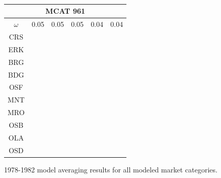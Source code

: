 \documentclass[12pt]{article}
\begin{document}
\begin{landscape}
\begin{figure}
{\begin{minipage}[c]{0.3\textwidth}
\begin{tabular}{|c|c|c|c|c|c|}
\end{tabular}\\$~$\\$~$\\
\begin{tabular}{|c|c|c|c|c|c|}
         \hline \multicolumn{6}{|c|}{MCAT 961} \\ \hline
         $\omega$&0.05&0.05&0.05&0.04&0.04 \\ \hline
        CRS&\cellcolor[HTML]{E41A1C}&\cellcolor[HTML]{E41A1C}&\cellcolor[HTML]{E41A1C}&\cellcolor[HTML]{E41A1C}&\cellcolor[HTML]{E41A1C} \\ \hline
        ERK&\cellcolor[HTML]{E41A1C}&\cellcolor[HTML]{E41A1C}&\cellcolor[HTML]{E41A1C}&\cellcolor[HTML]{377EB8}&\cellcolor[HTML]{377EB8} \\ \hline
        BRG&\cellcolor[HTML]{377EB8}&\cellcolor[HTML]{377EB8}&\cellcolor[HTML]{377EB8}&\cellcolor[HTML]{4DAF4A}&\cellcolor[HTML]{4DAF4A} \\ \hline
        BDG&\cellcolor[HTML]{377EB8}&\cellcolor[HTML]{377EB8}&\cellcolor[HTML]{377EB8}&\cellcolor[HTML]{4DAF4A}&\cellcolor[HTML]{4DAF4A} \\ \hline
        OSF&\cellcolor[HTML]{377EB8}&\cellcolor[HTML]{377EB8}&\cellcolor[HTML]{377EB8}&\cellcolor[HTML]{4DAF4A}&\cellcolor[HTML]{4DAF4A} \\ \hline
        MNT&\cellcolor[HTML]{4DAF4A}&\cellcolor[HTML]{4DAF4A}&\cellcolor[HTML]{4DAF4A}&\cellcolor[HTML]{984EA3}&\cellcolor[HTML]{984EA3} \\ \hline
        MRO&\cellcolor[HTML]{984EA3}&\cellcolor[HTML]{4DAF4A}&\cellcolor[HTML]{4DAF4A}&\cellcolor[HTML]{FF7F00}&\cellcolor[HTML]{984EA3} \\ \hline
        OSB&\cellcolor[HTML]{984EA3}&\cellcolor[HTML]{984EA3}&\cellcolor[HTML]{984EA3}&\cellcolor[HTML]{FFFF33}&\cellcolor[HTML]{984EA3} \\ \hline
        OLA&\cellcolor[HTML]{FF7F00}&\cellcolor[HTML]{984EA3}&\cellcolor[HTML]{FF7F00}&\cellcolor[HTML]{FFFF33}&\cellcolor[HTML]{FF7F00} \\ \hline
        OSD&\cellcolor[HTML]{FF7F00}&\cellcolor[HTML]{FF7F00}&\cellcolor[HTML]{FF7F00}&\cellcolor[HTML]{FFFF33}&\cellcolor[HTML]{FFFF33} \\ \hline
\end{tabular}
\end{minipage}}
\caption{1978-1982 model averaging results for all modeled market categories.} 
\label{colorTabApp78}
\end{figure}
\end{landscape}
\end{document}
